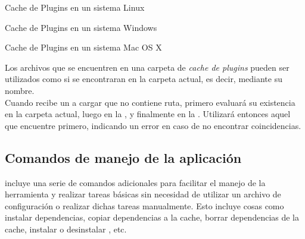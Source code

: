 \begin{folders}[h]
	\caption{Cache de Plugins en un sistema Linux}
	\label{folders:plugins:linux}
\end{folders}

\begin{folders}[h]
	\caption{Cache de Plugins en un sistema Windows}
	\label{folders:plugins:windows}
\end{folders}

\begin{folders}[h]
	\caption{Cache de Plugins en un sistema Mac OS X}
	\label{folders:plugins:osx}
\end{folders}

Los archivos \jar que se encuentren en una carpeta de \emph{cache de plugins} 
pueden  ser utilizados como si se encontraran en la carpeta actual, es decir, 
mediante su nombre.\\
Cuando \fronttier recibe un \plugin a cargar que no contiene ruta, primero 
evaluará su existencia en la carpeta actual, luego en la \plugincachel, y 
finalmente en la \plugincacheg. Utilizará entonces aquel que  encuentre 
primero, indicando un error en caso de no encontrar coincidencias.\\

\subsection{Comandos de manejo de la aplicación}
\label{subsec:commands}

\fronttier incluye una serie de comandos adicionales para facilitar el manejo de
la herramienta y realizar tareas básicas sin necesidad de utilizar un archivo
de configuración o realizar dichas tareas manualmente. Esto incluye cosas como
instalar dependencias, copiar dependencias a la cache, borrar dependencias de la
cache, instalar o desinstalar \plugins, etc.

